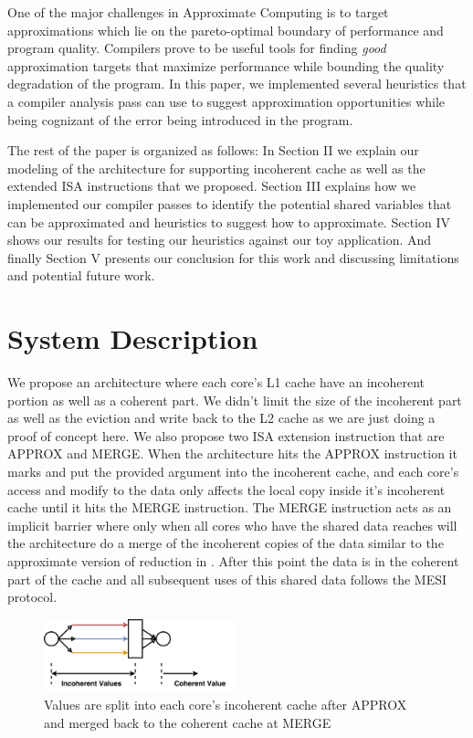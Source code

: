 \documentclass[12pt,conference]{IEEEtran}
\begin{document}
One of the major challenges in Approximate Computing is 
to target approximations which lie on the pareto-optimal
boundary of performance and program quality. Compilers prove
to be useful tools for finding \emph{good} approximation 
targets that maximize performance while bounding the
quality degradation of the program. In this paper, we implemented several 
heuristics that a compiler analysis pass can use to suggest approximation
opportunities while being cognizant of the error being introduced in the
program. 

The rest of the paper is organized as follows: In Section II we explain our 
modeling of the architecture for supporting incoherent cache as well as the
extended ISA instructions that we proposed. Section III explains how we implemented
our compiler passes to identify the potential shared variables that can be
approximated and heuristics to suggest how to approximate. Section IV
shows our results for testing our heuristics against our toy application. And 
finally Section V presents our conclusion for this work and discussing limitations
and potential future work.

\section{System Description}

We propose an architecture where each core's L1 cache have an incoherent
portion as well as a coherent part. We didn't limit the size of the 
incoherent part as well as the eviction and write back to the L2 cache as
we are just doing a proof of concept here. We also propose two ISA extension
instruction that are APPROX and MERGE. When the architecture hits the 
APPROX instruction it marks and put the provided argument into the incoherent
cache, and each core's access and modify to the data only affects the local
copy inside it's incoherent cache until it hits the MERGE instruction. The
MERGE instruction acts as an implicit barrier where only when all cores
who have the shared data reaches will the architecture do a merge of the
incoherent copies of the data similar to the approximate version of reduction
in \cite{paraprox}. After this point the data is in the coherent part of the
cache and all subsequent uses of this shared data follows the MESI protocol.
\begin{figure}[h]
    \centering
    \includegraphics[width=0.50\textwidth]{incoherent.pdf}
    \caption{Values are split into each core's incoherent cache after APPROX and merged back to the coherent cache at MERGE}
    \label{fig:incoherent}
\end{figure}
\end{document}
